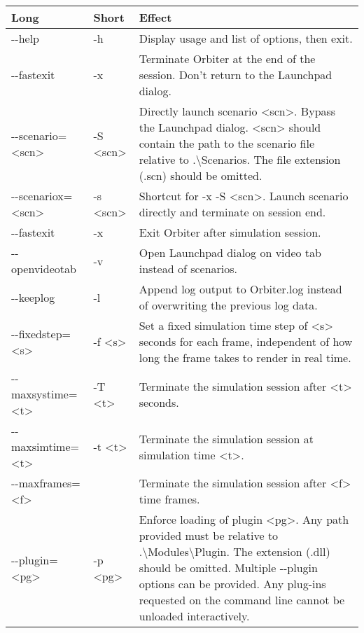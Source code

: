 \documentclass[Orbiter User Manual.tex]{subfiles}
\begin{document}
	\begin{longtable}{ |p{}|p{}|p{}| }
	\hline\rule{0pt}{2ex}
	\textbf{Long} & \textbf{Short} & \textbf{Effect}\\
	\hline\rule{0pt}{2ex}
	-{}-help & -h & Display usage and list of options, then exit.\\
	\hline\rule{0pt}{2ex}
	-{}-fastexit & -x & Terminate Orbiter at the end of the session. Don't return to the Launchpad dialog.\\
	\hline\rule{0pt}{2ex}
	-{}-scenario=<scn> & -S <scn> & Directly launch scenario <scn>. Bypass the Launchpad dialog. <scn> should contain the path to the scenario file relative to .\textbackslash Scenarios. The file extension (.scn) should be omitted.\\
	\hline\rule{0pt}{2ex}
	-{}-scenariox=<scn> & -s <scn> & Shortcut for -x -S <scn>. Launch scenario directly and terminate on session end.\\
	\hline\rule{0pt}{2ex}
	-{}-fastexit & -x & Exit Orbiter after simulation session.\\
	\hline\rule{0pt}{2ex}
	-{}-openvideotab & -v & Open Launchpad dialog on video tab instead of scenarios.\\
	\hline\rule{0pt}{2ex}
	-{}-keeplog & -l & Append log output to Orbiter.log instead of overwriting the previous log data.\\
	\hline\rule{0pt}{2ex}
	-{}-fixedstep=<s> & -f <s> & Set a fixed simulation time step of <s> seconds for each frame, independent of how long the frame takes to render in real time.\\
	\hline\rule{0pt}{2ex}
	-{}-maxsystime=<t> & -T <t> & Terminate the simulation session after <t> seconds.\\
	\hline\rule{0pt}{2ex}
	-{}-maxsimtime=<t> & -t <t> & Terminate the simulation session at simulation time <t>.\\
	\hline\rule{0pt}{2ex}
	-{}-maxframes=<f> & & Terminate the simulation session after <f> time frames.\\
	\hline\rule{0pt}{2ex}
	-{}-plugin=<pg> & -p <pg> & Enforce loading of plugin <pg>. Any path provided must be relative to .\textbackslash Modules\textbackslash Plugin. The extension (.dll) should be omitted. Multiple -{}-plugin options can be provided. Any plug-ins requested on the command line cannot be unloaded interactively.\\
	\hline
	\end{longtable}
\end{document}
